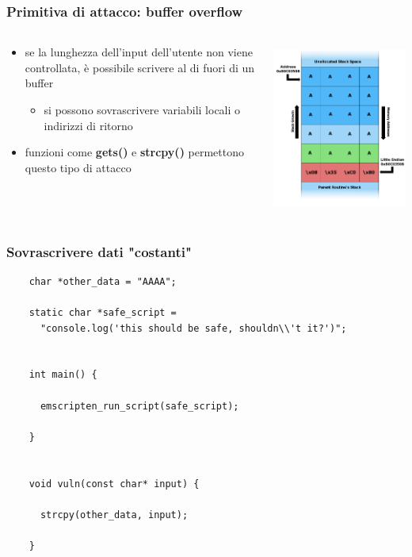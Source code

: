 \documentclass{beamer}
\newcommand\Fontvi{\fontsize{9.5}{7.2}\selectfont}
\begin{document}
\begin{frame}
  \frametitle{Primitiva di attacco: buffer overflow}
  \begin{columns}
    \begin{column}{0.6\textwidth}
      \begin{itemize}
        \item se la lunghezza dell'input dell'utente non viene controllata,
          è possibile scrivere al di fuori di un buffer
        \begin{itemize}
          \item si possono sovrascrivere variabili locali o indirizzi di
            ritorno
        \end{itemize}
        \pause
        \item funzioni come \textbf{gets()} e \textbf{strcpy()} permettono questo tipo di attacco  
      \end{itemize} 
    \end{column}
    \begin{column}{0.4\textwidth}
      \centerline{\includegraphics[width=9cm,height=5.5cm,keepaspectratio]{images/stack.png}}
    \end{column}
  \end{columns}
\end{frame}

\begin{frame}[fragile]
  \frametitle{Sovrascrivere dati "costanti"}
  \Fontvi
  \begin{verbatim}
    char *other_data = "AAAA";

    static char *safe_script = 
      "console.log('this should be safe, shouldn\\'t it?')";


    int main() {
       
      emscripten_run_script(safe_script);
    
    }


    void vuln(const char* input) {
    
      strcpy(other_data, input);

    }
  \end{verbatim}
\end{frame}
\end{document}

